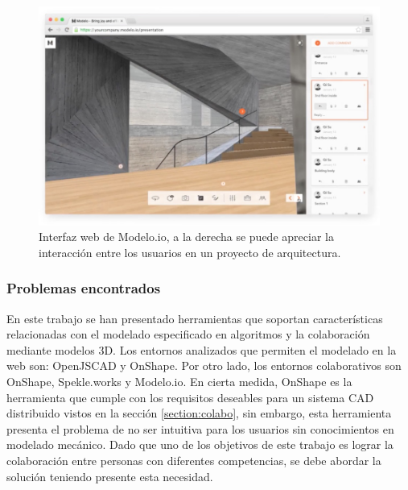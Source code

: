 \begin{figure}[h]
\includegraphics[width=14cm]{Img/WEB/modeloio.jpg}
\centering
\caption{\footnotesize{Interfaz web de Modelo.io, a la derecha se puede apreciar la interacción entre los usuarios \citep{Anthony2016} en un proyecto de arquitectura.}}
\label{fig:modelo.io}
\end{figure}




\subsubsection{Problemas encontrados}
En este trabajo se han presentado herramientas que soportan características relacionadas con el modelado especificado en algoritmos y la colaboración mediante modelos 3D. Los entornos analizados que permiten el modelado en la web son: OpenJSCAD y OnShape. Por otro lado, los entornos colaborativos son OnShape, Spekle.works y Modelo.io.
En cierta medida, OnShape es la herramienta que cumple con los requisitos deseables para un sistema CAD distribuido vistos en la sección \ref{section:colabo}, sin embargo, esta herramienta presenta el problema de no ser intuitiva para los usuarios sin conocimientos en modelado mecánico. Dado que uno de los objetivos de este trabajo es lograr la colaboración entre personas con diferentes competencias, se debe abordar la solución teniendo presente esta necesidad.